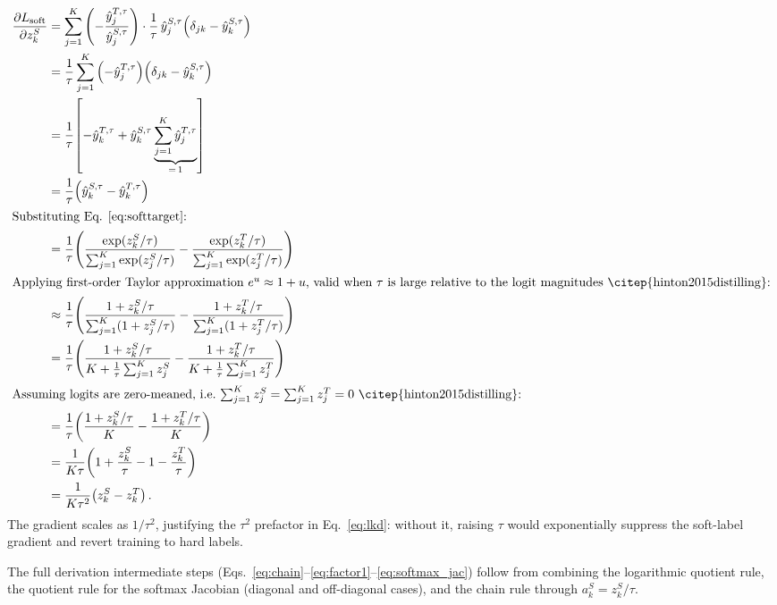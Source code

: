\documentclass{article}
\theoremstyle{plain}
\theoremstyle{definition}
\theoremstyle{remark}
\begin{document}
\begin{align}
  \frac{\partial L_{\mathrm{soft}}}{\partial z_k^S}
  &= \sum_{j=1}^{K}
      \left(-\frac{\hat{y}_j^{T,\tau}}{\hat{y}_j^{S,\tau}}\right)
      \cdot
      \frac{1}{\tau}\,\hat{y}_j^{S,\tau}
        \!\left(\delta_{jk} - \hat{y}_k^{S,\tau}\right)
  \nonumber\\
  &= \frac{1}{\tau}\sum_{j=1}^{K}
      \left(-\hat{y}_j^{T,\tau}\right)
        \!\left(\delta_{jk} - \hat{y}_k^{S,\tau}\right)
  \nonumber\\
  &= \frac{1}{\tau}\!\left[
      -\hat{y}_k^{T,\tau}
      + \hat{y}_k^{S,\tau}\underbrace{\sum_{j=1}^{K}
        \hat{y}_j^{T,\tau}}_{=\,1}
    \right]
  \nonumber\\
  &= \frac{1}{\tau}\!\left(\hat{y}_k^{S,\tau}
      - \hat{y}_k^{T,\tau}\right)
  \nonumber\\
  \intertext{Substituting Eq. \eqref{eq:softtarget}:}
  &= \frac{1}{\tau}\!\left(
        \frac{\exp(z_k^S/\tau)}{\sum_{j=1}^K \exp(z_j^S/\tau)}
        -
        \frac{\exp(z_k^T/\tau)}{\sum_{j=1}^K \exp(z_j^T/\tau)}
     \right)
  \nonumber\\
  \intertext{Applying first-order Taylor approximation $e^u \approx 1 + u$, valid when $\tau$ is large relative to the logit magnitudes \citep{hinton2015distilling}:}
  &\approx \frac{1}{\tau}\!\left(
        \frac{1 + z_k^S/\tau}{\sum_{j=1}^K (1 + z_j^S/\tau)}
        -
        \frac{1 + z_k^T/\tau}{\sum_{j=1}^K (1 + z_j^T/\tau)}
     \right)
  \nonumber\\
  &= \frac{1}{\tau}\!\left(
        \frac{1 + z_k^S/\tau}{K + \frac{1}{\tau}\sum_{j=1}^K z_j^S}
        -
        \frac{1 + z_k^T/\tau}{K + \frac{1}{\tau}\sum_{j=1}^K z_j^T}
     \right)
  \nonumber\\
  \intertext{Assuming logits are zero-meaned, i.e.\ $\sum_{j=1}^K z_j^S = \sum_{j=1}^K z_j^T = 0$ \citep{hinton2015distilling}:}
  &= \frac{1}{\tau}\!\left(
        \frac{1 + z_k^S/\tau}{K}
        -
        \frac{1 + z_k^T/\tau}{K}
     \right)
  \nonumber\\
  &= \frac{1}{K\tau}\!\left(
        1 + \frac{z_k^S}{\tau}
        - 1 - \frac{z_k^T}{\tau}
     \right)
  \nonumber\\
  &= \frac{1}{K\tau^2}\!\left(z_k^S - z_k^T\right).\nonumber
  \label{eq:soft_grad_final}
\end{align}
The gradient scales as $1/\tau^2$, justifying the $\tau^2$ prefactor in Eq.~\eqref{eq:lkd}: without it, raising $\tau$ would exponentially suppress the soft-label gradient and revert training to hard labels.

The full derivation intermediate steps (Eqs.~\eqref{eq:chain}--\eqref{eq:factor1}--\eqref{eq:softmax_jac}) follow from combining the logarithmic quotient rule, the quotient rule for the softmax Jacobian (diagonal and off-diagonal cases), and the chain rule through $a_k^S = z_k^S/\tau$.



\end{document}
